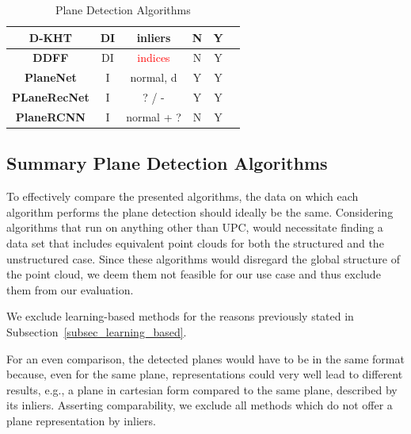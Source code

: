 \documentclass[main.tex]{subfiles}
\begin{document}
\begin{table}[!ht]
\begin{tabular}{|c|c|c|c|c|c}
        \textbf{D-KHT}  \cite{Vera_Lucio_Fernandes_Velho_2018}           & DI                  & inliers                               & N                       & Y                     \\ \hline
        \textbf{DDFF} \cite{Roychoudhury_Missura_Bennewitz_2021}         & DI                  & \textcolor{red}{indices}              & N                       & Y                     \\ \hline
        \textbf{PlaneNet} \cite{Liu_Yang_Ceylan_Yumer_Furukawa_2018}     & I                   & normal, d & Y                       & Y                     \\ \hline
        \textbf{PLaneRecNet} \cite{Xie_Shu_Rambach_Pagani_Stricker_2022} & I                   & ? / -                                 & Y                       & Y                     \\ \hline
        \textbf{PlaneRCNN} \cite{Liu_Kim_Gu_Furukawa_Kautz_2019}         & I                   & normal + ?                            & N                       & Y                     \\ \hline
    \end{tabular}
    \caption{Plane Detection Algorithms}
    \label{tab:my-table}
\end{table}

\subsection*{Summary Plane Detection Algorithms}
To effectively compare the presented algorithms, the data on which each algorithm performs the plane detection should ideally be the same.
Considering algorithms that run on anything other than UPC, would necessitate finding a data set that includes equivalent point clouds for both the structured and the unstructured case.
Since these algorithms would disregard the global structure of the point cloud, we deem them not feasible for our use case and thus exclude them from our evaluation.

We exclude learning-based methods for the reasons previously stated in Subsection~\ref{subsec_learning_based}.

For an even comparison, the detected planes would have to be in the same format because, even for the same plane, representations could very well lead to different results, e.g., a plane in cartesian form compared to the same plane, described by its inliers.
Asserting comparability, we exclude all methods which do not offer a plane representation by inliers.
\end{document}
